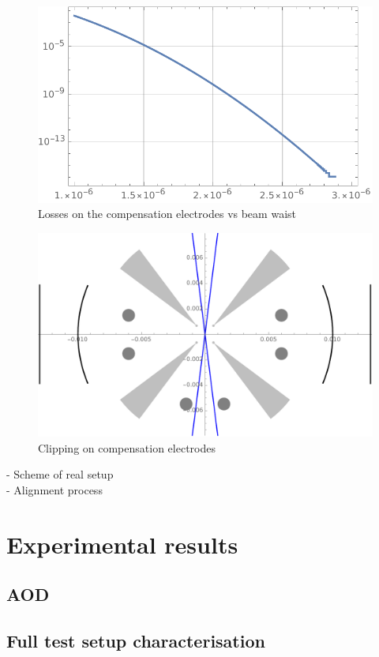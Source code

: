 \documentclass[english, a4paper, 12pt, twoside]{book}
\numberwithin{equation}{section} %
\begin{document}
\begin{figure}[H]
\centering
\includegraphics[width=\textwidth]{img/Plosses}
\caption{Losses on the compensation electrodes vs beam waist}
\end{figure}
\begin{figure}[H]
\centering
\includegraphics[width=\textwidth]{img/clipping}
\caption{Clipping on compensation electrodes}
\end{figure}

- Scheme of real setup \\
- Alignment process

\chapter{Experimental results}
\section{AOD}
\section{Full test setup characterisation}
\end{document}
